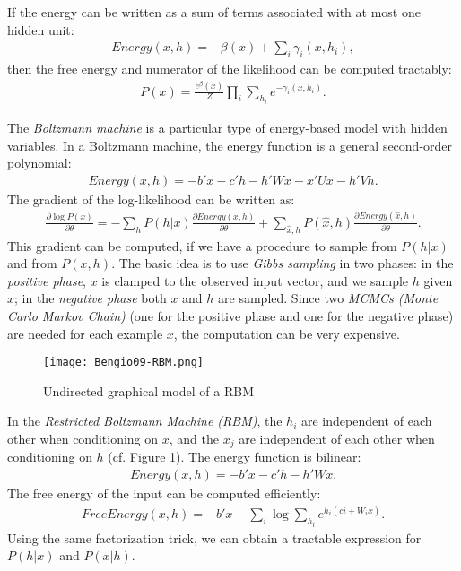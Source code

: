 If the energy can be written as a sum of terms associated with at most one hidden unit:
\begin{eqnarray}
Energy(x,h) = -\beta(x) + \sum_i \gamma_i(x, h_i),
\end{eqnarray}
then the free energy and numerator of the likelihood can be computed tractably:
\begin{eqnarray}
P(x) = \frac{e^\beta(x)}{Z} \prod_i \sum_{h_i} e^{-\gamma_i(x, h_i)}.
\end{eqnarray}

The \emph{Boltzmann machine} is a particular type of energy-based model with hidden variables. In a Boltzmann machine, the energy function is a general second-order polynomial:
\begin{eqnarray}
Energy(x,h) = -b'x - c'h - h'Wx - x'Ux - h'Vh.
\end{eqnarray}
The gradient of the log-likelihood can be written as:
\begin{eqnarray}
\frac{\partial \log P(x)}{\partial \theta} = - \sum_h P(h|x) \frac{\partial Energy(x,h)}{\partial \theta} + \sum_{\hat{x},h} P(\hat{x}, h) \frac{\partial Energy(\hat{x},h)}{\partial \theta}.
\end{eqnarray}
This gradient can be computed, if we have a procedure to sample from $P(h|x)$ and from $P(x,h)$. The basic idea is to use \emph{Gibbs sampling} in two phases: in the \emph{positive phase}, $x$ is clamped to the observed input vector, and we sample $h$ given $x$; in the \emph{negative phase} both $x$ and $h$ are sampled. Since two \emph{MCMCs (Monte Carlo Markov Chain)} (one for the positive phase and one for the negative phase) are needed for each example $x$, the computation can be very expensive.

\begin{figure}[h]
  \centering
  \texttt{[image: Bengio09-RBM.png]}\\
  \caption{Undirected graphical model of a RBM}\label{fig:Bengio09}
\end{figure}

In the \emph{Restricted Boltzmann Machine (RBM)}, the $h_i$ are independent of each other when conditioning on $x$, and the $x_j$ are independent of each other when conditioning on $h$ (cf. Figure \ref{fig:Bengio09}). The energy function is bilinear:
\begin{eqnarray}
Energy(x,h) = -b'x - c'h - h'Wx.
\end{eqnarray}
The free energy of the input can be computed efficiently:
\begin{eqnarray}
FreeEnergy(x,h) = -b'x - \sum_i \log \sum_{h_i} e^{h_i(ci + W_i x)}.
\end{eqnarray}
Using the same factorization trick, we can obtain a tractable expression for $P(h|x)$ and $P(x|h)$.


